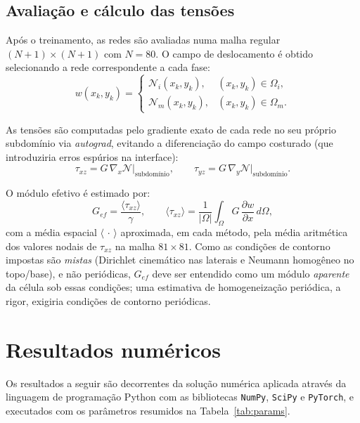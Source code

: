 \documentclass[brazil]{TCAM} %
\begin{document}
\subsection{Avaliação e cálculo das tensões}

Após o treinamento, as redes são avaliadas numa malha regular $(N+1)\times(N+1)$
com $N = 80$. O campo de deslocamento é obtido selecionando a rede correspondente
a cada fase:
\begin{equation*}
    w(x_k, y_k) =
    \begin{cases}
        \mathcal{N}_i(x_k,y_k), & (x_k,y_k) \in \Omega_i, \\
        \mathcal{N}_m(x_k,y_k), & (x_k,y_k) \in \Omega_m.
    \end{cases}
\end{equation*}

As tensões são computadas pelo gradiente exato de cada rede no seu próprio
subdomínio via \textit{autograd}, evitando a diferenciação do campo costurado
(que introduziria erros espúrios na interface):
\begin{equation*}
    \tau_{xz} = G\,\nabla_x \mathcal{N}\big|_{\text{subdomínio}}, \qquad
    \tau_{yz} = G\,\nabla_y \mathcal{N}\big|_{\text{subdomínio}}.
\end{equation*}

O módulo efetivo é estimado por:
\begin{equation*}
    G_{ef} = \frac{\langle \tau_{xz} \rangle}{\gamma},
    \qquad
    \langle \tau_{xz} \rangle = \frac{1}{|\Omega|}\int_{\Omega} G\,\frac{\partial w}{\partial x}\, d\Omega ,
\end{equation*}
com a média espacial $\langle\,\cdot\,\rangle$ aproximada, em cada método, pela média
aritmética dos valores nodais de $\tau_{xz}$ na malha $81\times81$. Como as condições
de contorno impostas são \emph{mistas} (Dirichlet cinemático nas laterais e Neumann
homogêneo no topo/base), e não periódicas, $G_{ef}$ deve ser entendido como um módulo
\emph{aparente} da célula sob essas condições; uma estimativa de homogeneização
periódica, a rigor, exigiria condições de contorno periódicas.

\section{Resultados numéricos}

Os resultados a seguir são decorrentes da solução numérica aplicada através da linguagem de programação Python com as bibliotecas \texttt{NumPy},
\texttt{SciPy} e \texttt{PyTorch}, e executados com os parâmetros resumidos na
Tabela~\ref{tab:params}.
\end{document}
